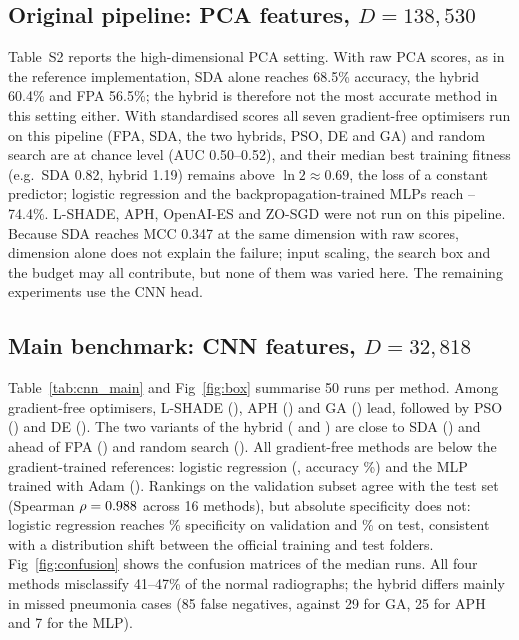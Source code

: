 \documentclass[preprint,12pt]{elsarticle}
\begin{document}
\subsection{Original pipeline: PCA features, \texorpdfstring{$D=138{,}530$}{D = 138,530}}\label{sec:pca}
Table~S2 reports the high-dimensional PCA setting. With raw PCA scores, as in the reference implementation, SDA alone reaches 68.5\% accuracy, the hybrid 60.4\% and FPA 56.5\%; the hybrid is therefore not the most accurate method in this setting either. With standardised scores all seven gradient-free optimisers run on this pipeline (FPA, SDA, the two hybrids, PSO, DE and GA) and random search are at chance level (AUC 0.50--0.52), and their median best training fitness (e.g.\ SDA 0.82, hybrid 1.19) remains above $\ln 2\approx0.69$, the loss of a constant predictor; logistic regression and the backpropagation-trained MLPs reach \MlpSgdPcaAcc--74.4\%. L-SHADE, APH, OpenAI-ES and ZO-SGD were not run on this pipeline. Because SDA reaches MCC 0.347 at the same dimension with raw scores, dimension alone does not explain the failure; input scaling, the search box and the budget may all contribute, but none of them was varied here. The remaining experiments use the CNN head.


\subsection{Main benchmark: CNN features, \texorpdfstring{$D=32{,}818$}{D = 32,818}}
Table~\ref{tab:cnn_main} and Fig~\ref{fig:box} summarise 50 runs per method. Among gradient-free optimisers, L-SHADE (\MCCLShade), APH (\MCCAph) and GA (\MCCGa) lead, followed by PSO (\MCCPso) and DE (\MCCDe). The two variants of the hybrid (\MCCHybrid{} and \MCCHybridReinit) are close to SDA (\MCCSda) and ahead of FPA (\MCCFpa) and random search (\MCCRandom). All gradient-free methods are below the gradient-trained references: logistic regression (\MCCLogreg, accuracy \ACCLogreg\%) and the MLP trained with Adam (\MCCMlpAdam). Rankings on the validation subset agree with the test set (Spearman $\rho=0.988$ across 16 methods), but absolute specificity does not: logistic regression reaches \LRValSpec\% specificity on validation and \LRTestSpec\% on test, consistent with a distribution shift between the official training and test folders. Fig~\ref{fig:confusion} shows the confusion matrices of the median runs. All four methods misclassify 41--47\% of the normal radiographs; the hybrid differs mainly in missed pneumonia cases (85 false negatives, against 29 for GA, 25 for APH and 7 for the MLP).
\end{document}
